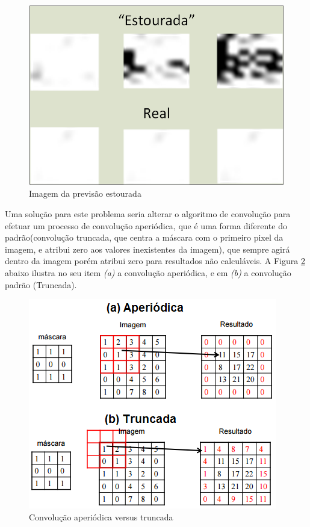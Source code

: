 \begin{figure}[h]
	\centering	
    \includegraphics[scale=1]{Figuras/Image-PrevisaoEstourada.png}
	\caption{Imagem da previsão estourada}
	\label{fig:ForecastingSpike}
\end{figure}

Uma solução para este problema seria alterar o algoritmo de convolução para efetuar um processo de convolução aperiódica, que é uma forma diferente do padrão(convolução truncada, que centra a máscara com o primeiro pixel da imagem, e atribui zero aos valores inexistentes da imagem), que sempre agirá dentro da imagem porém atribui zero para resultados não calculáveis. A Figura \ref{fig:convApvsTr} abaixo ilustra no seu item \emph{(a)} a convolução aperiódica, e em \emph{(b)} a convolução padrão (Truncada).

\begin{figure}[h]
	\centering	
    \includegraphics[scale=1]{Figuras/ConvolucaoAperiodica.png}
	\caption{Convolução aperiódica versus truncada}
	\label{fig:convApvsTr}
\end{figure}

